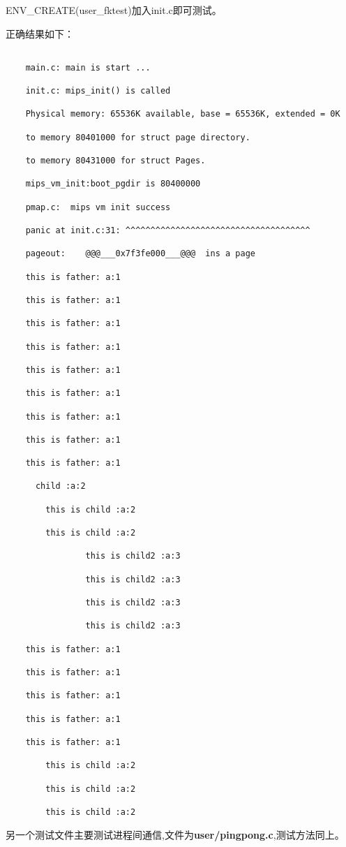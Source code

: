ENV\_CREATE(user\_fktest)加入init.c即可测试。

正确结果如下：

\begin{verbatim}

	main.c:	main is start ...
	
	init.c:	mips_init() is called
	
	Physical memory: 65536K available, base = 65536K, extended = 0K
	
	to memory 80401000 for struct page directory.
	
	to memory 80431000 for struct Pages.
	
	mips_vm_init:boot_pgdir is 80400000
	
	pmap.c:	 mips vm init success
	
	panic at init.c:31: ^^^^^^^^^^^^^^^^^^^^^^^^^^^^^^^^^^^^^
	
	pageout:	@@@___0x7f3fe000___@@@  ins a page 
	
	this is father: a:1
	
	this is father: a:1
	
	this is father: a:1
	
	this is father: a:1
	
	this is father: a:1
	
	this is father: a:1
	
	this is father: a:1
	
	this is father: a:1
	
	this is father: a:1
	  
	  child :a:2
	
		this is child :a:2
		
		this is child :a:2
			
				this is child2 :a:3
	
				this is child2 :a:3
				
				this is child2 :a:3
								
				this is child2 :a:3
				
	this is father: a:1
	
	this is father: a:1
	
	this is father: a:1
	
	this is father: a:1
	
	this is father: a:1
	
		this is child :a:2
		
		this is child :a:2
		
		this is child :a:2
\end{verbatim}

另一个测试文件主要测试进程间通信,文件为\textbf{user/pingpong.c},测试方法同上。

